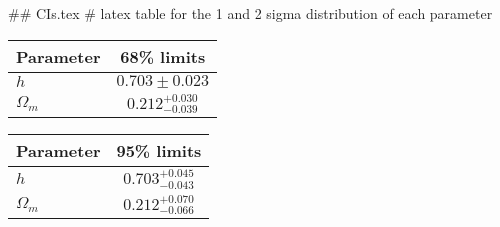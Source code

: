 ## CIs.tex
# latex table for the 1 and 2 sigma distribution of each parameter

\begin{tabular} { l  c}
 Parameter &  68\% limits\\
\hline
{\boldmath$h              $} & $0.703\pm 0.023            $\\
{\boldmath$\Omega_m       $} & $0.212^{+0.030}_{-0.039}   $\\
\hline
\end{tabular}

\begin{tabular} { l  c}
 Parameter &  95\% limits\\
\hline
{\boldmath$h              $} & $0.703^{+0.045}_{-0.043}   $\\
{\boldmath$\Omega_m       $} & $0.212^{+0.070}_{-0.066}   $\\
\hline
\end{tabular}

